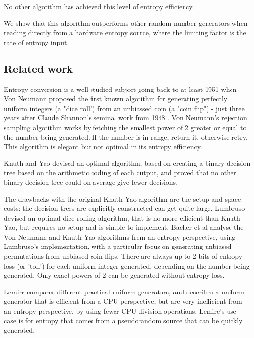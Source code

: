 \documentclass[12pt]{article}
\begin{document}
No other algorithm has achieved this level of entropy efficiency.

We show that this algorithm outperforms other random number generators when reading directly from a hardware entropy source, where the limiting factor is the rate of entropy input.

\subsection{Related work}

Entropy conversion is a well studied subject going back to at least 1951 when Von Neumann \cite{neumann51} proposed the first known algorithm for generating perfectly uniform integers (a "dice roll") from an unbiassed coin (a "coin flip") - just three years after Claude Shannon's seminal work from 1948 \cite{shannon1948mathematical}. Von Neumann's rejection sampling algorithm works by fetching the smallest power of 2 greater or equal to the number being generated. If the number is in range, return it, otherwise retry. This algorithm is elegant but not optimal in its entropy efficiency.

Knuth and Yao \cite{Knuth1976TheCO} devised an optimal algorithm, based on creating a binary decision tree based on the arithmetic coding of each output, and proved that no other binary decision tree could on average give fewer decisions.

The drawbacks with the original Knuth-Yao algorithm are the setup and space costs: the decision trees are explicitly constructed can get quite large. Lumbruso \cite{lumbroso2013optimal} devised an optimal dice rolling algorithm, that is no more efficient than Knuth-Yao, but requires no setup and is simple to implement. Bacher et al \cite{bacher2017} analyse the Von Neumann and Knuth-Yao algorithms from an entropy perspective, using Lumbruso's implementation, with a particular focus on generating unbiased permutations from unbiased coin flips. There are always up to 2 bits of entropy loss (or 'toll') for each uniform integer generated, depending on the number being generated. Only exact powers of 2 can be generated without entropy loss.

Lemire \cite{lemire2019fast} compares different practical uniform generators, and describes a uniform generator that is efficient from a CPU perspective, but are very inefficient from an entropy perspective, by using fewer CPU division operations. Lemire's use case is for entropy that comes from a pseudorandom source that can be quickly generated.
\end{document}
